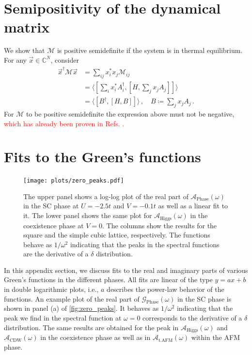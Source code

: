 \documentclass[
    reprint, 
    aps,
    preprintnumbers,
    twocolumn,
    prb,
    superscriptaddress
]{revtex4-2}
\newcommand{\mM}{\mathcal{M}}
\newcommand{\greens}[1]{\mathcal{G}_\text{#1} (\omega)}
\newcommand{\spectral}[1]{\mathcal{A}_\text{#1}  (\omega)}
\newcommand{\markEdited}{red}
\begin{document}
\appendix
\section{Semipositivity of the dynamical matrix}
\label{sec:positive_M}

We show that $\mathcal{M}$ is positive semidefinite if the system is in thermal equilibrium.
For any $\vec{x} \in \mathbb{C}^N$, consider
\begin{align}
    \vec{x}^\dagger \mM \vec{x} &= \sum_{ij} x_i^* x_j \mM_{ij} \nonumber \\
        &= \langle \left[ \sum_i x_i^* A_i^\dagger, \left[ H, \sum_j x_j A_j \right] \right]  \rangle \nonumber \\
        &= \langle [B^\dagger, [H, B]] \rangle\,,\quad B \coloneqq  \sum_j x_j A_j\,.
\end{align}
For $\mM$ to be positive semidefinite the expression above must not be negative,
\textcolor{\markEdited}{which has already been proven in Refs. \cite{Dyson1978,mermin66}.}

\section{Fits to the Green's functions}
\label{sec:fit_greens_functions}

\begin{figure}
    \centering
    \texttt{[image: plots/zero\_peaks.pdf]}
    \caption{The upper panel shows a log-log plot of the real part of $\spectral{Phase}$ in the SC phase at $U=-2.5t$ and $V=-0.1t$ as well as a linear fit to it.
    The lower panel shows the same plot for $\spectral{Higgs}$ in the coexistence phase at $V=0$. The columns show the results for the square and the simple cubic lattice, respectively.
    The functions behave as $1/\omega^2$ indicating that the peaks in the spectral functions are the derivative of a $\delta$ distribution.}
    \label{fig:zero_peaks}
\end{figure}

In this appendix section, we discuss fits to the real and imaginary parts of various Green's functions in the different phases.
All fits are linear of the type $y = ax + b$ in double logarithmic plots, i.e., $a$ describes the power-law behavior of the functions.
An example plot of the real part of $\greens{Phase}$ in the SC phase is shown in panel (a) of \autoref{fig:zero_peaks}.
It behaves as $1/\omega^2$ indicating that the peak we find in the spectral function at $\omega=0$ corresponds to the derivative of a $\delta$ distribution.
The same results are obtained for the peak in $\spectral{Higgs}$ and $\spectral{CDW}$ in the coexistence phase as well as in $\spectral{t.AFM}$ within the AFM phase.
\end{document}
